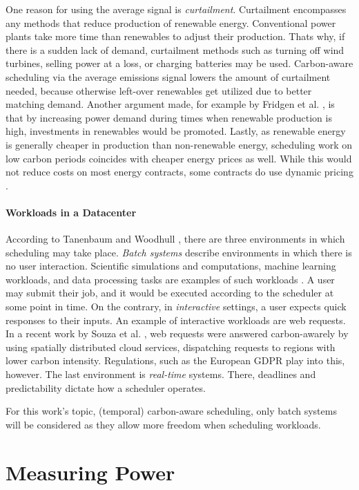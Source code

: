 One reason for using the average signal is \emph{curtailment}. 
Curtailment encompasses any methods that reduce production of renewable energy. 
Conventional power plants take more time than renewables to adjust their production.
Thats why, if there is a sudden lack of demand, curtailment methods such as turning off wind turbines, selling power at a loss, or charging batteries may be used. 
Carbon-aware scheduling via the average emissions signal lowers the amount of curtailment needed, because otherwise left-over renewables get utilized due to better matching demand.
Another argument made, for example by Fridgen et al. \cite{fridgen_not_2021}, is that by increasing power demand during times when renewable production is high, investments in renewables would be promoted. 
Lastly, as renewable energy is generally cheaper in production than non-renewable energy, scheduling work on low carbon periods coincides with cheaper energy prices as well. While this would not reduce costs on most energy contracts, some contracts do use dynamic pricing .

\paragraph{Workloads in a Datacenter} According to Tanenbaum and Woodhull \cite{tanenbaum_operating_2006}, there are three environments in which scheduling may take place. \emph{Batch systems} describe environments in which there is no user interaction. 
Scientific simulations and computations, machine learning workloads, and data processing tasks are examples of such workloads \cite{sukprasert_limitations_2024}. 
A user may submit their job, and it would be executed according to the scheduler at some point in time. 
On the contrary, in \emph{interactive} settings, a user expects quick responses to their inputs. 
An example of interactive workloads are web requests. In a recent work by Souza et al. \cite{souza_casper_2024}, web requests were answered carbon-awarely by using spatially distributed cloud services, dispatching requests to regions with lower carbon intensity. 
Regulations, such as the European GDPR  play into this, however.
The last environment is \emph{real-time} systems. There, deadlines and predictability dictate how a scheduler operates.

For this work's topic, (temporal) carbon-aware scheduling, only batch systems will be considered as they allow more freedom when scheduling workloads.

\section{Measuring Power}

